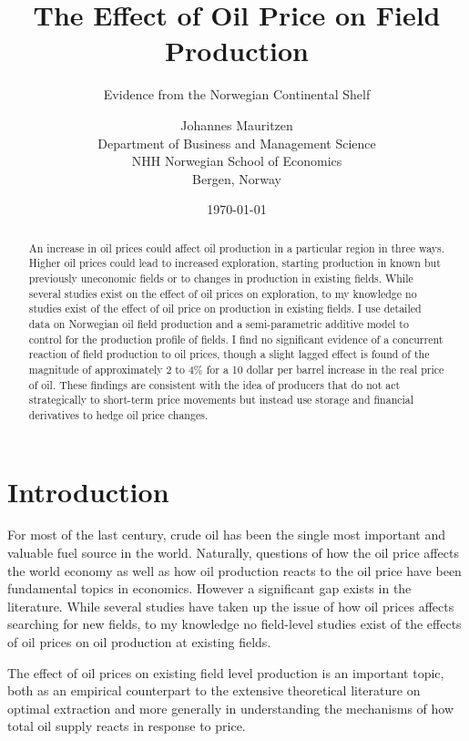 \documentclass[12pt]{scrartcl} %
\title{The Effect of Oil Price on Field Production}
\subtitle{Evidence from the Norwegian Continental Shelf}
\author{
  		Johannes Mauritzen \\
        Department of Business and Management Science\\
        NHH Norwegian School of Economics\\
        Bergen, Norway \\	           
		}
\date{\today}
\begin{document}
\begin{spacing}{1} %
	\maketitle
\end{spacing}

\begin{abstract}
An increase in oil prices could affect oil production in a particular region in three ways.  Higher oil prices could lead to increased exploration, starting production in known but previously uneconomic fields or to changes in production in existing fields.  While several studies exist on the effect of oil prices on exploration, to my knowledge no studies exist of the effect of oil price on production in existing fields.  I use detailed data on Norwegian oil field production and a semi-parametric additive model to control for the production profile of fields.  I find no significant evidence of a concurrent reaction of field production to oil prices, though a slight lagged effect is found of the magnitude of approximately 2 to 4\% for a 10 dollar per barrel increase in the real price of oil.  These findings are consistent with the idea of producers that do not act strategically to short-term price movements but instead use storage and financial derivatives to hedge oil price changes.  
\end{abstract}





\section{Introduction}

For most of the last century, crude oil has been the single most important and valuable fuel source in the world.  Naturally, questions of how the oil price affects the world economy as well as how oil production reacts to the oil price have been fundamental topics in economics. However a significant gap exists in the literature.  While several studies have taken up the issue of how oil prices affects searching for new fields, to my knowledge no field-level studies exist of the effects of oil prices on oil production at existing fields.  

The effect of oil prices on existing field level production is an important topic, both as an empirical counterpart to the extensive theoretical literature on optimal extraction and more generally in understanding the mechanisms of how total oil supply reacts in response to price.  
\end{document}
